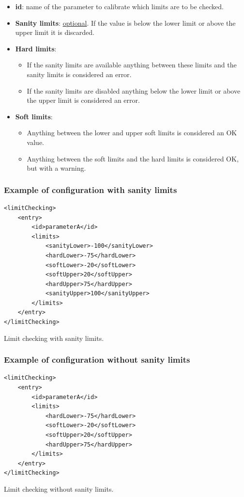 \begin{itemize}
\item \textbf{id}: name of the parameter to calibrate which limits are to be checked.
\item \textbf{Sanity limits}: \underline{optional}. If the value is below the lower limit or above the upper limit it is discarded. 
\item \textbf{Hard limits}:
	\begin{itemize}
	\item If the sanity limits are available anything between these limits and the sanity limits is considered an error.
	\item If the sanity limits are disabled anything below the lower limit or above the upper limit is considered an error. 
	\end{itemize}
\item \textbf{Soft limits}: 
\begin{itemize}
\item Anything between the lower and upper soft limits is considered an OK value.
\item Anything between the soft limits and the hard limits is considered OK, but with a warning.
\end{itemize}
\end{itemize}

\subsubsection{Example of configuration with sanity limits}

\begin{table}[H]
\lstset{language=XML}
\begin{lstlisting}
<limitChecking>
	<entry>
		<id>parameterA</id>
		<limits>
			<sanityLower>-100</sanityLower>
			<hardLower>-75</hardLower>
			<softLower>-20</softLower>
			<softUpper>20</softUpper>
			<hardUpper>75</hardUpper>
			<sanityUpper>100</sanityUpper>
		</limits>
	</entry>
</limitChecking>
\end{lstlisting}
\caption{Limit checking with sanity limits.}
\label{Table5.12}
\end{table}

\subsubsection{Example of configuration without sanity limits}

\begin{table}[H]
\lstset{language=XML}
\begin{lstlisting}
<limitChecking>
	<entry>
		<id>parameterA</id>
		<limits>
			<hardLower>-75</hardLower>
			<softLower>-20</softLower>
			<softUpper>20</softUpper>
			<hardUpper>75</hardUpper>
		</limits>
	</entry>
</limitChecking>
\end{lstlisting}
\caption{Limit checking without sanity limits.}
\label{Table5.13}
\end{table}


\newpage

